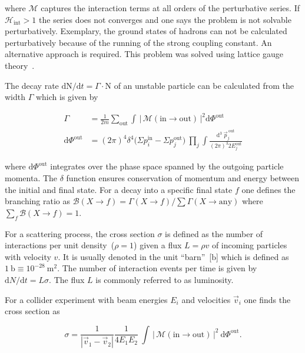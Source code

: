 where $\mathcal{M}$ captures the interaction terms at all orders of the perturbative series. If $\mathcal{H}_\mathrm{int}>1$ the series does not converges and one says the problem is not solvable perturbatively. Exemplary, the ground states of hadrons can not be calculated perturbatively because of the running of the strong coupling constant. An alternative approach is required. This problem was solved using lattice gauge theory~\cite{Durr:2008zz}.

The decay rate $\mathrm{d}\mathrm{N}/\mathrm{d}t=\Gamma\cdot\mathrm{N}$ of an unstable particle can be calculated from the width $\Gamma$ which is given by

\begin{align}
\Gamma&=\frac{1}{2m}\sum_\mathrm{out}\int\,\big|\,\mathcal{M}(\mathrm{in}\to\mathrm{out})\,\big|^2\mathrm{d}\Phi^\mathrm{out}\\
\mathrm{d}\Phi^\mathrm{out}&=(2\pi)^{4}\delta^{4}\big(\Sigma p^\mathrm{in}_{i}-\Sigma p^\mathrm{out}_{j}\big)~\prod_{j}\int\frac{\mathrm{d}^{3}~\vec{p}^\mathrm{~out}_{j}}{(2\pi)^{3}2E_{j}^\mathrm{out}}
\end{align}

where $\mathrm{d}\Phi^\mathrm{out}$ integrates over the phase space spanned by the outgoing particle momenta. The $\delta$ function ensures conservation of momentum and energy between the initial and final state. For a decay into a specific final state $f$ one defines the branching ratio as $\mathcal{B}(X\to f)=\Gamma(X \to f)/\sum\Gamma(X \to\mathrm{any})$ where $\sum_{f}\mathcal{B}(X \to f)=1$.

For a scattering process, the cross section $\sigma$ is defined as the number of interactions per unit density~($\rho=1$) given a flux $L=\rho v$ of incoming particles with velocity $v$. It is usually denoted in the unit ``barn''~[$\mathrm{b}$] which is defined as $1~\mathrm{b}\equiv 10^{-28}~\mathrm{m}^{2}$.  The number of interaction events per time is given by $\mathrm{d}N/\mathrm{d}t=L\sigma$. The flux $L$ is commonly referred to as luminosity.

For a collider experiment with beam energies $E_{i}$ and velocities $\vec{v}_{i}$ one finds the cross section as 

\begin{equation}
\sigma=\frac{1}{|\vec{v}_1-\vec{v}_2|}\frac{1}{4E_{1}E_{2}}~\int\,\big|\,\mathcal{M}(\mathrm{in}\to\mathrm{out})\,\big|^{2}~\mathrm{d}\Phi^\mathrm{out}. \label{eq:theory-xsec-calculation}
\end{equation}

